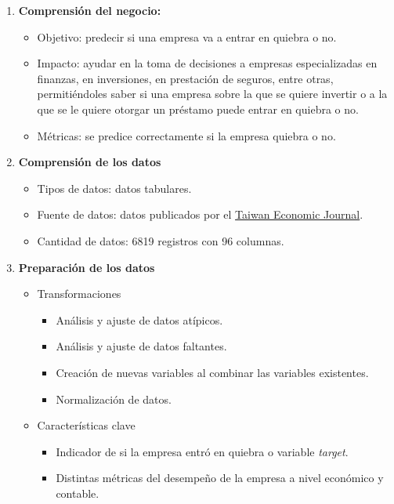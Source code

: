 \documentclass[
11pt, %
]{charter}
\begin{document}
\begin{enumerate}
  \item \textbf{Comprensión del negocio:}
    \begin{itemize}
        \item Objetivo: predecir si una empresa va a entrar en quiebra o no.
        \item Impacto: ayudar en la toma de decisiones a empresas especializadas en finanzas, en inversiones, en prestación de seguros, entre otras, permitiéndoles saber si una empresa sobre la que se quiere invertir o a la que se le quiere otorgar un préstamo puede entrar en quiebra o no.
        \item Métricas: se predice correctamente si la empresa quiebra o no.
    \end{itemize}
  \item \textbf{Comprensión de los datos}
    \begin{itemize}
        \item Tipos de datos: datos tabulares.
        \item Fuente de datos: datos publicados por el \href{https://www.tejwin.com/en/}{Taiwan Economic Journal}.
        \item Cantidad de datos: 6819 registros con 96 columnas.
    \end{itemize}
  \item \textbf{Preparación de los datos}
    \begin{itemize}
        \item Transformaciones
            \begin{itemize}
                \item Análisis y ajuste de datos atípicos.
                \item Análisis y ajuste de datos faltantes.
                \item Creación de nuevas variables al combinar las variables existentes.
                \item Normalización de datos.
            \end{itemize}
        \item Características clave
            \begin{itemize}
                \item Indicador de si la empresa entró en quiebra o variable \textit{target}.
                \item Distintas métricas del desempeño de la empresa a nivel económico y contable.
            \end{itemize}

\end{itemize}
\end{enumerate}
\end{document}
